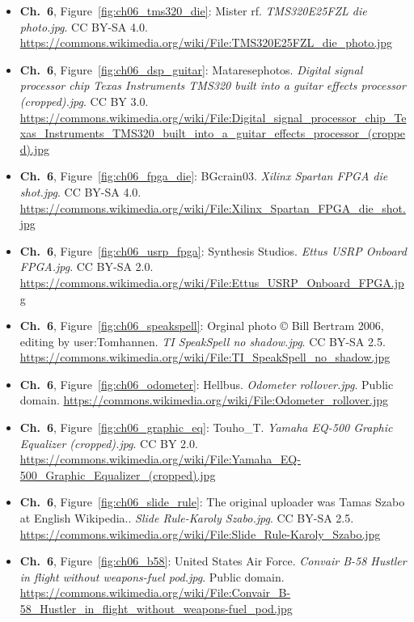 \begin{small}
\begin{itemize}[leftmargin=0pt,itemsep=2pt,label={}]
\item \textbf{Ch.~6}, Figure~\ref{fig:ch06_tms320_die}: Mister rf. \emph{TMS320E25FZL die photo.\allowbreak{}jpg}. CC BY-SA 4.0. \url{https://commons.wikimedia.org/wiki/File:TMS320E25FZL_die_photo.jpg}
\item \textbf{Ch.~6}, Figure~\ref{fig:ch06_dsp_guitar}: Mataresephotos. \emph{Digital signal processor chip Texas Instruments TMS320 built into a guitar effects processor (cropped).\allowbreak{}jpg}. CC BY 3.0. \url{https://commons.wikimedia.org/wiki/File:Digital_signal_processor_chip_Texas_Instruments_TMS320_built_into_a_guitar_effects_processor_(cropped).jpg}
\item \textbf{Ch.~6}, Figure~\ref{fig:ch06_fpga_die}: BGcrain03. \emph{Xilinx Spartan FPGA die shot.\allowbreak{}jpg}. CC BY-SA 4.0. \url{https://commons.wikimedia.org/wiki/File:Xilinx_Spartan_FPGA_die_shot.jpg}
\item \textbf{Ch.~6}, Figure~\ref{fig:ch06_usrp_fpga}: Synthesis Studios. \emph{Ettus USRP Onboard FPGA.\allowbreak{}jpg}. CC BY-SA 2.0. \url{https://commons.wikimedia.org/wiki/File:Ettus_USRP_Onboard_FPGA.jpg}
\item \textbf{Ch.~6}, Figure~\ref{fig:ch06_speakspell}: Orginal photo © Bill Bertram 2006, editing by user:Tomhannen. \emph{TI SpeakSpell no shadow.\allowbreak{}jpg}. CC BY-SA 2.5. \url{https://commons.wikimedia.org/wiki/File:TI_SpeakSpell_no_shadow.jpg}
\item \textbf{Ch.~6}, Figure~\ref{fig:ch06_odometer}: Hellbus. \emph{Odometer rollover.\allowbreak{}jpg}. Public domain. \url{https://commons.wikimedia.org/wiki/File:Odometer_rollover.jpg}
\item \textbf{Ch.~6}, Figure~\ref{fig:ch06_graphic_eq}: Touho\_T. \emph{Yamaha EQ-\allowbreak{}500 Graphic Equalizer (cropped).\allowbreak{}jpg}. CC BY 2.0. \url{https://commons.wikimedia.org/wiki/File:Yamaha_EQ-500_Graphic_Equalizer_(cropped).jpg}
\item \textbf{Ch.~6}, Figure~\ref{fig:ch06_slide_rule}: The original uploader was Tamas Szabo at English Wikipedia.. \emph{Slide Rule-\allowbreak{}Karoly Szabo.\allowbreak{}jpg}. CC BY-SA 2.5. \url{https://commons.wikimedia.org/wiki/File:Slide_Rule-Karoly_Szabo.jpg}
\item \textbf{Ch.~6}, Figure~\ref{fig:ch06_b58}: United States Air Force. \emph{Convair B-\allowbreak{}58 Hustler in flight without weapons-\allowbreak{}fuel pod.\allowbreak{}jpg}. Public domain. \url{https://commons.wikimedia.org/wiki/File:Convair_B-58_Hustler_in_flight_without_weapons-fuel_pod.jpg}

\end{itemize}
\end{small}
